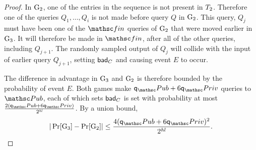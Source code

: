 \begin{proof}
	In $\textnormal{G}_2$, one of the entries in the sequence is not present in $T_2$. 
	Therefore one of the queries $Q_1, \ldots, Q_i$ is not made before query $Q$ in $\textnormal{G}_2$.
	This query, $Q_j$ must have been one of the $\Finalize$ queries of $\textnormal{G}_2$ that were moved earlier in $\textnormal{G}_3$.
	It will therefore be made in $\Finalize$, after all of the other queries, including $Q_{j+1}$.
	The randomly sampled output of $Q_j$ will collide with the input of earlier query $Q_{j+1}$, setting $\mathsf{bad}_C$ and causing event $E$ to occur.
	
	The difference in advantage in $\textnormal{G}_3$ and $\textnormal{G}_2$ is therefore bounded by the probability of event $E$.
	Both games make $\qPub+6\qPriv$ queries to $\PubO$, each of which sets $\mathsf{bad}_C$ is set with probability at most $\frac{2(\qPub+6\qPriv)}{2^{\hashlen}}$. 
	By a union bound,
	\[|\Pr[\Gm_3] - \Pr[\Gm_2]| \leq \frac{4(\qPub+6\qPriv)^2}{2^{\hashlen}}.\]
	

\end{proof}
